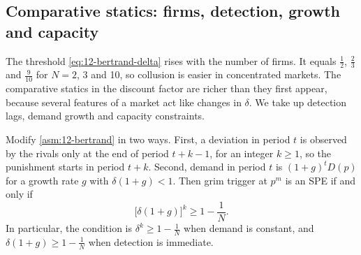 \subsection{Comparative statics: firms, detection, growth and capacity}\label{sec:12-bertrand-cs}

The threshold \eqref{eq:12-bertrand-delta} rises with the number of firms. It equals $\frac{1}{2}$, $\frac{2}{3}$
and $\frac{9}{10}$ for $N = 2$, 3 and 10, so collusion is easier in concentrated markets. The comparative statics in
the discount factor are richer than they first appear, because several features of a market act like changes in
$\delta$. We take up detection lags, demand growth and capacity constraints.

\begin{proposition}\label{prop:12-bertrand-ext}
Modify \cref{asm:12-bertrand} in two ways. First, a deviation in period $t$ is observed by the rivals only at the end
of period $t + k - 1$, for an integer $k \ge 1$, so the punishment starts in period $t + k$. Second, demand in period
$t$ is $(1 + g)^tD(p)$ for a growth rate $g$ with $\delta(1 + g) < 1$. Then grim trigger at $p^m$ is an SPE if and
only if
\begin{equation}\label{eq:12-bertrand-ext}
\bigl[\delta(1 + g)\bigr]^k \ge 1 - \frac{1}{N} .
\end{equation}
In particular, the condition is $\delta^k \ge 1 - \frac{1}{N}$ when demand is constant, and
$\delta(1 + g) \ge 1 - \frac{1}{N}$ when detection is immediate.
\end{proposition}

